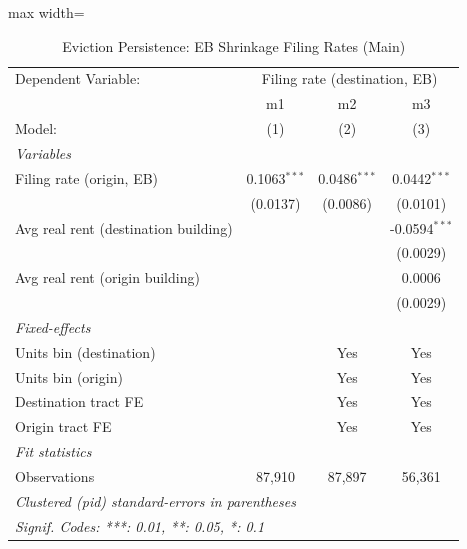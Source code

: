 \documentclass[
  11pt,
]{article}
\begin{document}
\begin{table}[htbp]
\centering
\caption{\label{tab:evict_persist} Eviction Persistence: EB Shrinkage Filing Rates (Main)}
\centering

\begin{adjustbox}{max width=\textwidth}
   \begin{tabular}{lccc}
      \tabularnewline \midrule \midrule
      Dependent Variable: & \multicolumn{3}{c}{Filing rate (destination, EB)}\\
                                           & m1             & m2             & m3 \\   
      Model:                               & (1)            & (2)            & (3)\\  
      \midrule
      \emph{Variables}\\
      Filing rate (origin, EB)             & 0.1063$^{***}$ & 0.0486$^{***}$ & 0.0442$^{***}$\\   
                                           & (0.0137)       & (0.0086)       & (0.0101)\\   
      Avg real rent (destination building) &                &                & -0.0594$^{***}$\\   
                                           &                &                & (0.0029)\\   
      Avg real rent (origin building)      &                &                & 0.0006\\   
                                           &                &                & (0.0029)\\   
      \midrule
      \emph{Fixed-effects}\\
      Units bin (destination)              &                & Yes            & Yes\\  
      Units bin (origin)                   &                & Yes            & Yes\\  
      Destination tract FE                 &                & Yes            & Yes\\  
      Origin tract FE                      &                & Yes            & Yes\\  
      \midrule
      \emph{Fit statistics}\\
      Observations                         & 87,910         & 87,897         & 56,361\\  
      \midrule \midrule
      \multicolumn{4}{l}{\emph{Clustered (pid) standard-errors in parentheses}}\\
      \multicolumn{4}{l}{\emph{Signif. Codes: ***: 0.01, **: 0.05, *: 0.1}}\\
   \end{tabular}

\end{adjustbox}
\end{table}
\end{document}
